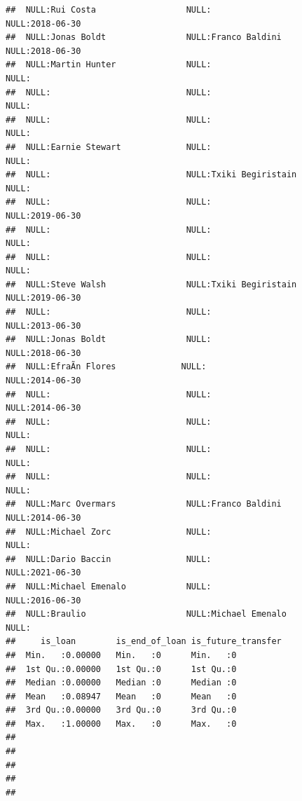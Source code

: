 \documentclass{article}\usepackage[]{graphicx}\usepackage[]{color}
\makeatletter
\newenvironment{kframe}{%
 \def\at@end@of@kframe{}%
 \ifinner\ifhmode%
  \def\at@end@of@kframe{\end{minipage}}%
  \begin{minipage}{\columnwidth}%
 \fi\fi%
 \def\FrameCommand##1{\hskip\@totalleftmargin \hskip-\fboxsep
 \colorbox{shadecolor}{##1}\hskip-\fboxsep
     \hskip-\linewidth \hskip-\@totalleftmargin \hskip\columnwidth}%
 \MakeFramed {\advance\hsize-\width
   \@totalleftmargin\z@ \linewidth\hsize
   \@setminipage}}%
 {\par\unskip\endMakeFramed%
 \at@end@of@kframe}
\newenvironment{knitrout}{}{} %
\makeatother
\begin{document}
\begin{knitrout}
\begin{kframe}
\begin{verbatim}
##  NULL:Rui Costa                  NULL:                         NULL:2018-06-30  
##  NULL:Jonas Boldt                NULL:Franco Baldini           NULL:2018-06-30  
##  NULL:Martin Hunter              NULL:                         NULL:            
##  NULL:                           NULL:                         NULL:            
##  NULL:                           NULL:                         NULL:            
##  NULL:Earnie Stewart             NULL:                         NULL:            
##  NULL:                           NULL:Txiki Begiristain        NULL:            
##  NULL:                           NULL:                         NULL:2019-06-30  
##  NULL:                           NULL:                         NULL:            
##  NULL:                           NULL:                         NULL:            
##  NULL:Steve Walsh                NULL:Txiki Begiristain        NULL:2019-06-30  
##  NULL:                           NULL:                         NULL:2013-06-30  
##  NULL:Jonas Boldt                NULL:                         NULL:2018-06-30  
##  NULL:EfraÃ­n Flores             NULL:                         NULL:2014-06-30  
##  NULL:                           NULL:                         NULL:2014-06-30  
##  NULL:                           NULL:                         NULL:            
##  NULL:                           NULL:                         NULL:            
##  NULL:                           NULL:                         NULL:            
##  NULL:Marc Overmars              NULL:Franco Baldini           NULL:2014-06-30  
##  NULL:Michael Zorc               NULL:                         NULL:            
##  NULL:Dario Baccin               NULL:                         NULL:2021-06-30  
##  NULL:Michael Emenalo            NULL:                         NULL:2016-06-30  
##  NULL:Braulio                    NULL:Michael Emenalo          NULL:            
##     is_loan        is_end_of_loan is_future_transfer
##  Min.   :0.00000   Min.   :0      Min.   :0         
##  1st Qu.:0.00000   1st Qu.:0      1st Qu.:0         
##  Median :0.00000   Median :0      Median :0         
##  Mean   :0.08947   Mean   :0      Mean   :0         
##  3rd Qu.:0.00000   3rd Qu.:0      3rd Qu.:0         
##  Max.   :1.00000   Max.   :0      Max.   :0         
##                                                     
##                                                     
##                                                     
##                                                     
##                                                     

\end{verbatim}
\end{kframe}
\end{knitrout}
\end{document}
